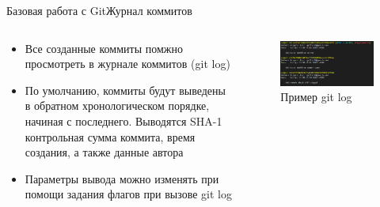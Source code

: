 \begin{frame}{Базовая работа с Git}{Журнал коммитов}
    \begin{columns}
        \begin{column}{0.6\textwidth}
            \begin{itemize}
                \item
                      Все созданные коммиты помжно просмотреть в журнале коммитов (git log)
                \item
                      По умолчанию, коммиты будут выведены в обратном хронологическом порядке, начиная с последнего. Выводятся SHA-1 контрольная сумма коммита, время создания, а также данные автора
                \item
                      Параметры вывода можно изменять при помощи задания флагов при вызове git log
            \end{itemize}
        \end{column}
        \begin{column}{0.4\textwidth}
            \begin{figure}
                \centering
                \includegraphics[width=\textwidth]{images/git-log-example.png}
                \caption{Пример git log}
            \end{figure}
        \end{column}
    \end{columns}

\end{frame}